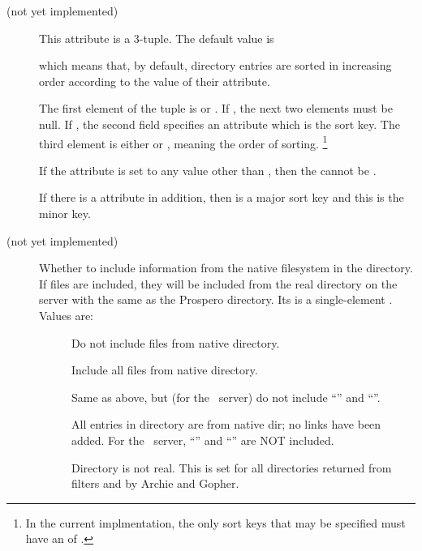 \begin{description}
\item[ (not yet implemented)]  This attribute
is a 3-tuple.  The 
default value is 
\begin{command}
\end{command}
which means that, by default, directory entries are sorted in increasing
order according to the value of their 
attribute.

The first element of the tuple is  or .  If
, the next two elements must be null.  If ,
the second field specifies an attribute which is the sort key.  The
third element is either  or , meaning
the order of sorting.%
\footnote{In the current implmentation, the only sort keys
that may be specified must have an  of
.}

If the  attribute is set to any value other than
, then the  cannot be
.

If there is a  attribute in addition, then
 is a major sort key and this is the minor key.


\item[ (not yet implemented)] Whether to include
information from the native filesystem in the directory.  If files are
included, they will be included from the real directory on the server
with the same  as the Prospero directory.  Its
 is a single-element .  
Values are:
\begin{description}
\item[] Do not include files from native directory.
\item[]  Include all files from native directory.
\item[]	Same as above, but (for the \unix\  server) do not
include ``'' and ``''.
\item[] All entries in directory are from native dir;
	no links have been added.  For the \unix\  server, ``'' and
``'' are NOT included. 
\item[] Directory is not real.  This is set for all
directories returned from filters and by Archie and Gopher.
\end{description}

\end{description}

